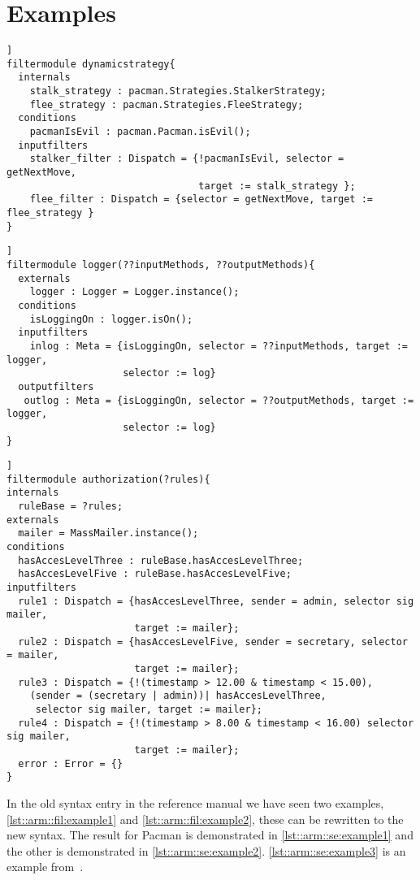 \section*{Examples}
\begin{lstlisting}[caption = {Dynamic strategy filter module in Pacman in new filter syntax}, label=lst::arm::se:example1,style = listing, language = ComposeStar,float=[tpb]]
filtermodule dynamicstrategy{
  internals
    stalk_strategy : pacman.Strategies.StalkerStrategy;
    flee_strategy : pacman.Strategies.FleeStrategy;
  conditions
    pacmanIsEvil : pacman.Pacman.isEvil();
  inputfilters
    stalker_filter : Dispatch = {!pacmanIsEvil, selector = getNextMove, 
                                 target := stalk_strategy };
    flee_filter : Dispatch = {selector = getNextMove, target := flee_strategy }
}
\end{lstlisting}
\begin{lstlisting}[caption = {Custom logging filter module, in new filter syntax}, label=lst::arm::se:example2,style = listing, language = ComposeStar,float=[tpb]]
filtermodule logger(??inputMethods, ??outputMethods){
  externals
    logger : Logger = Logger.instance();
  conditions
    isLoggingOn : logger.isOn();
  inputfilters
    inlog : Meta = {isLoggingOn, selector = ??inputMethods, target := logger,
                    selector := log}
  outputfilters
   outlog : Meta = {isLoggingOn, selector = ??outputMethods, target := logger,
                    selector := log}
}
\end{lstlisting}
\begin{lstlisting}[caption={The mass mailer from the filter syntax analysis},label= lst::arm::se:example3,style=listing,language=Composestar,float=[tpb]]
filtermodule authorization(?rules){
internals
  ruleBase = ?rules; 
externals
  mailer = MassMailer.instance();
conditions
  hasAccesLevelThree : ruleBase.hasAccesLevelThree;
  hasAccesLevelFive : ruleBase.hasAccesLevelFive;
inputfilters
  rule1 : Dispatch = {hasAccesLevelThree, sender = admin, selector sig mailer,
                      target := mailer};
  rule2 : Dispatch = {hasAccesLevelFive, sender = secretary, selector = mailer,
                      target := mailer};
  rule3 : Dispatch = {!(timestamp > 12.00 & timestamp < 15.00),
    (sender = (secretary | admin))| hasAccesLevelThree,
     selector sig mailer, target := mailer};
  rule4 : Dispatch = {!(timestamp > 8.00 & timestamp < 16.00) selector sig mailer,
                      target := mailer};
  error : Error = {}  
}
\end{lstlisting}
In the old syntax entry in the reference manual we have seen two examples, \autoref{lst::arm::fil:example1} and \autoref{lst::arm::fil:example2}, these 
can be rewritten to the new syntax. The result for Pacman is demonstrated in \autoref{lst::arm::se:example1}
and the other is demonstrated in \autoref{lst::arm::se:example2}. \autoref{lst::arm::se:example3} is
an example from~\cite{Doornenbal2006}.

